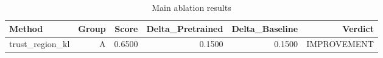 \begin{table}[htbp]
\centering
\caption{Main ablation results}
\label{tab:main-results}
\begin{tabular}{lrrrrr}
\toprule
\textbf{Method} & \textbf{Group} & \textbf{Score} & \textbf{Delta\_Pretrained} & \textbf{Delta\_Baseline} & \textbf{Verdict} \\
\midrule
trust\_region\_kl & A & 0.6500 & 0.1500 & 0.1500 & IMPROVEMENT \\
\bottomrule
\end{tabular}
\end{table}